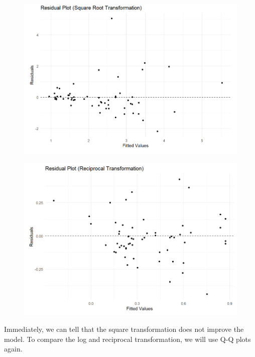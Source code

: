 \documentclass{article}
\begin{document}
\begin{figure}
    \includegraphics[width=\linewidth]{graphs/graph-sqrt.png}
\end{figure}

\begin{figure}
    \includegraphics[width=\linewidth]{graphs/graph-over.png}
\end{figure}

Immediately, we can tell that the square transformation does not improve the model. To compare the log and reciprocal transformation, we will use Q-Q plots again.
\end{document}
